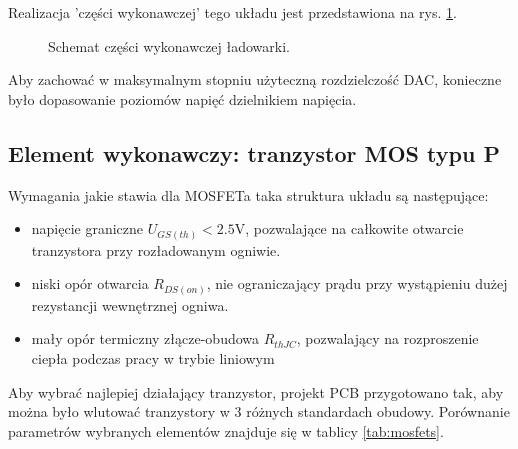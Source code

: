 \documentclass[polish,engineer]{polsl-msth}
\begin{document}
Realizacja 'części wykonawczej' tego układu jest przedstawiona na rys. \ref{img:charging_circuit}. 
\begin{figure}[hbtp]
     \caption{Schemat części wykonawczej ładowarki. \label{img:charging_circuit}}
\end{figure}
Aby zachować w maksymalnym stopniu użyteczną rozdzielczość DAC, konieczne było dopasowanie poziomów napięć dzielnikiem napięcia.

\subsection{Element wykonawczy: tranzystor MOS typu P\label{section:mosfet} }
Wymagania jakie stawia dla MOSFETa taka struktura układu są następujące:
\begin{itemize}
    \item napięcie graniczne $U_{GS(th)} < 2.5\mathrm{V}$, pozwalające na całkowite otwarcie tranzystora przy rozładowanym ogniwie.
    \item niski opór otwarcia $R_{DS(on)}$, nie ograniczający prądu przy wystąpieniu dużej rezystancji wewnętrznej ogniwa.
    \item mały opór termiczny złącze-obudowa $R_{thJC}$, pozwalający na rozproszenie ciepła podczas pracy w trybie liniowym
\end{itemize}
Aby wybrać najlepiej działający tranzystor, projekt PCB przygotowano tak, aby można było wlutować tranzystory w 3 różnych standardach obudowy. Porównanie parametrów wybranych elementów znajduje się w tablicy \ref{tab:mosfets}.
\end{document}
